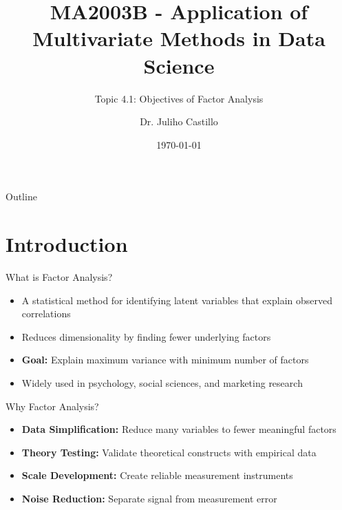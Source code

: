 \documentclass[aspectratio=169]{beamer}
\title[Objectives of Factor Analysis]{MA2003B - Application of Multivariate Methods in Data Science}
\subtitle{Topic 4.1: Objectives of Factor Analysis}
\author{Dr. Juliho Castillo}
\institute{Tec de Monterrey}
\date{\today}
\begin{document}
\begin{frame}
  \titlepage
\end{frame}

\begin{frame}{Outline}
  \tableofcontents
\end{frame}

\section{Introduction}
\begin{frame}{What is Factor Analysis?}
  \begin{itemize}
    \item A statistical method for identifying latent variables that explain observed correlations
    \item Reduces dimensionality by finding fewer underlying factors
    \item \textbf{Goal:} Explain maximum variance with minimum number of factors
    \item Widely used in psychology, social sciences, and marketing research
  \end{itemize}
\end{frame}

\begin{frame}{Why Factor Analysis?}
  \begin{itemize}
    \item \textbf{Data Simplification:} Reduce many variables to fewer meaningful factors
    \item \textbf{Theory Testing:} Validate theoretical constructs with empirical data
    \item \textbf{Scale Development:} Create reliable measurement instruments
    \item \textbf{Noise Reduction:} Separate signal from measurement error
  \end{itemize}
\end{frame}
\end{document}
